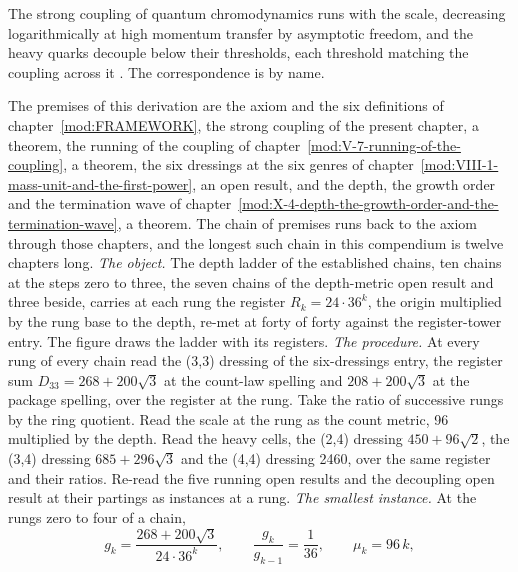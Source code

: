 \begin{chbridge}
The strong coupling of quantum chromodynamics runs with the scale, decreasing logarithmically at high momentum transfer by asymptotic freedom, and the heavy quarks decouple below their thresholds, each threshold matching the coupling across it \cite{Gross1973,Politzer1973}. The correspondence is by name.
\end{chbridge}
\begin{chproof}
The premises of this derivation are the axiom and the six definitions of chapter~\ref{mod:FRAMEWORK}, the strong coupling of the present chapter, a theorem, the running of the coupling of chapter~\ref{mod:V-7-running-of-the-coupling}, a theorem, the six dressings at the six genres of chapter~\ref{mod:VIII-1-mass-unit-and-the-first-power}, an open result, and the depth, the growth order and the termination wave of chapter~\ref{mod:X-4-depth-the-growth-order-and-the-termination-wave}, a theorem. The chain of premises runs back to the axiom through those chapters, and the longest such chain in this compendium is twelve chapters long.
\textit{The object.} The depth ladder of the established chains, ten chains at the steps zero to three, the seven chains of the depth-metric open result and three beside, carries at each rung the register $R_{k} = 24\cdot 36^{k}$, the origin multiplied by the rung base to the depth, re-met at forty of forty against the register-tower entry. The figure draws the ladder with its registers.
\textit{The procedure.} At every rung of every chain read the (3,3) dressing of the six-dressings entry, the register sum $D_{33} = 268 + 200\sqrt{3}$ at the count-law spelling and $208 + 200\sqrt{3}$ at the package spelling, over the register at the rung. Take the ratio of successive rungs by the ring quotient. Read the scale at the rung as the count metric, 96 multiplied by the depth. Read the heavy cells, the (2,4) dressing $450 + 96\sqrt{2}$, the (3,4) dressing $685 + 296\sqrt{3}$ and the (4,4) dressing 2460, over the same register and their ratios. Re-read the five running open results and the decoupling open result at their partings as instances at a rung.
\textit{The smallest instance.} At the rungs zero to four of a chain,
\begin{equation} g_{k} = \frac{268 + 200\sqrt{3}}{24\cdot 36^{k}}, \qquad \frac{g_{k}}{g_{k-1}} = \frac{1}{36}, \qquad \mu_{k} = 96\,k , \end{equation}

\end{chproof}
